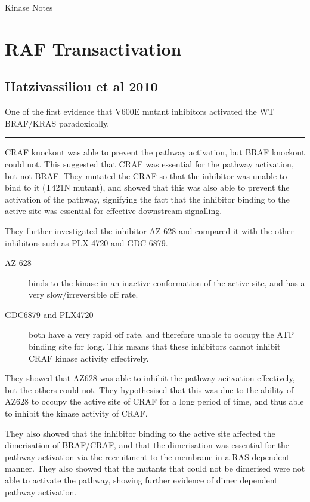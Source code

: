 \documentclass[a4paper,12pt]{article}
\begin{document}
\begin{center}
\LARGE{Kinase Notes}
\end{center}

\section* {RAF Transactivation}

\subsection*{\normalsize{Hatzivassiliou et al 2010}}

One of the first evidence that V600E mutant inhibitors activated the WT BRAF/KRAS paradoxically.

\noindent\rule{\textwidth}{0.4pt}

CRAF knockout was able to prevent the pathway activation, but BRAF knockout could not.
This suggested that CRAF was essential for the pathway activation, but not BRAF.
They mutated the CRAF so that the inhibitor was unable to bind to it (T421N mutant), and showed that this was also able to prevent the activation of the pathway, signifying the fact that the inhibitor binding to the active site was essential for effective downstream signalling.

They further investigated the inhibitor AZ-628 and compared it with the other inhibitors such as PLX 4720 and GDC 6879.
\begin{description}
\item[AZ-628] binds to the kinase in an inactive conformation of the active site, and has a very slow/irreversible off rate.
\item[GDC6879 and PLX4720] both have a very rapid off rate, and therefore unable to occupy the ATP binding site for long.
This means that these inhibitors cannot inhibit CRAF kinase activity effectively.
\end{description}

They showed that AZ628 was able to inhibit the pathway acitvation effectively, but the others could not.
They hypothesised that this was due to the ability of AZ628 to occupy the active site of CRAF for a long period of time, and thus able to inhibit the kinase activity of CRAF.

They also showed that the inhibitor binding to the active site affected the dimerisation of BRAF/CRAF, and that the dimerisation was essential for the pathway activation via the recruitment to the membrane in a RAS-dependent manner.
They also showed that the mutants that could not be dimerised were not able to activate the pathway, showing further evidence of dimer dependent pathway activation.
\end{document}
